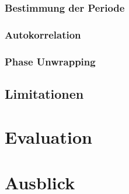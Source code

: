 \documentclass[10pt,a4paper]{scrreport}
\begin{document}
		\subsubsection{Bestimmung der Periode}

		\subsubsection{Autokorrelation}
	
		\subsubsection{Phase Unwrapping}


\subsection{Limitationen}

\section{Evaluation}

\section{Ausblick}
\end{document}
